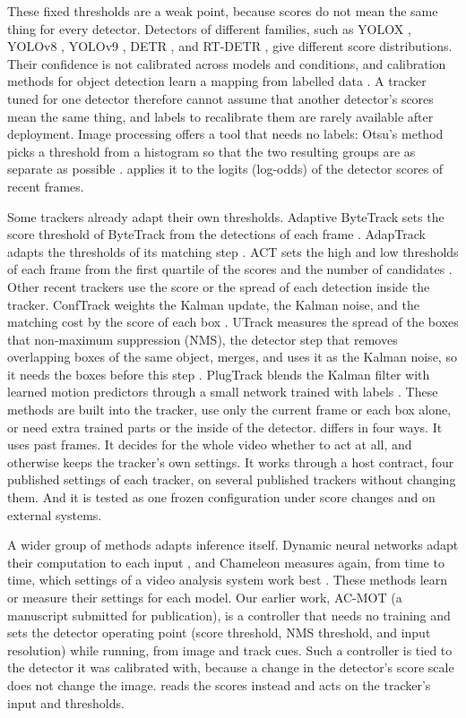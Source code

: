 These fixed thresholds are a weak point, because scores do not mean the same
thing for every detector. Detectors of different families, such as YOLOX
\cite{ge2021yolox}, YOLOv8 \cite{jocher2023yolov8}, YOLOv9
\cite{wang2024yolov9}, DETR \cite{carion2020detr}, and RT-DETR
\cite{zhao2024rtdetr}, give different score distributions. Their confidence
is not calibrated across models and conditions, and calibration methods for
object detection learn a mapping from labelled data
\cite{kuppers2020detcalib}. A tracker tuned for one detector therefore cannot
assume that another detector's scores mean the same thing, and labels to
recalibrate them are rarely available after deployment. Image processing
offers a tool that needs no labels: Otsu's method picks a threshold from a
histogram so that the two resulting groups are as separate as possible
\cite{otsu1979}. \scl{} applies it to the logits (log-odds) of the detector
scores of recent frames.

Some trackers already adapt their own thresholds. Adaptive ByteTrack sets the
score threshold of ByteTrack from the detections of each frame
\cite{ma2023adaptivebytetrack}. AdapTrack adapts the thresholds of its
matching step \cite{shim2024adaptrack}. ACT sets the high and low thresholds
of each frame from the first quartile of the scores and the number of
candidates \cite{act2026adaptive}. Other recent trackers use the score or the
spread of each detection inside the tracker. ConfTrack weights the Kalman
update, the Kalman noise, and the matching cost by the score of each box
\cite{jung2024conftrack}. UTrack measures the spread of the boxes that
non-maximum suppression (NMS), the detector step that removes overlapping boxes
of the same object, merges, and uses it as the Kalman noise, so it needs the
boxes before this step \cite{solano2025utrack}. PlugTrack blends the Kalman
filter with learned motion predictors through a small network trained with
labels \cite{kim2026plugtrack}. These methods are built into the tracker, use
only the current frame or each box alone, or need extra trained parts or the
inside of the detector. \scl{} differs in four ways. It uses past
frames. It decides for the whole video whether to act at all, and otherwise
keeps the tracker's own settings. It works through a host contract, four published
settings of each tracker, on several published trackers without changing them. And it is tested as one
frozen configuration under score changes and on external systems.

A wider group of methods adapts inference itself. Dynamic neural networks
adapt their computation to each input \cite{han2022dynamic}, and Chameleon
measures again, from time to time, which settings of a video analysis system
work best \cite{jiang2018chameleon}. These methods learn or measure their
settings for each model. Our earlier work, AC-MOT (a manuscript submitted for publication), is a controller that
needs no training and sets the detector operating point (score threshold,
NMS threshold, and input resolution) while running, from image and track
cues. Such a controller is tied to the detector it was calibrated with,
because a change in the detector's score scale does not change the image.
\scl{} reads the scores instead and acts on the tracker's input and
thresholds.

